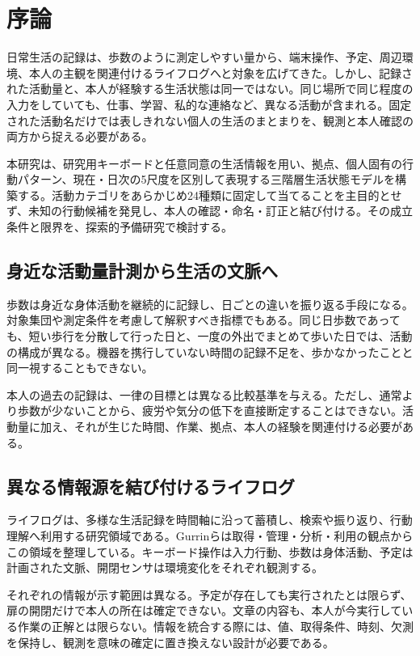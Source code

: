 \chapter{序論}
\label{chap:introduction}

日常生活の記録は、歩数のように測定しやすい量から、端末操作、予定、周辺環境、本人の主観を関連付けるライフログへと対象を広げてきた。しかし、記録された活動量と、本人が経験する生活状態は同一ではない。同じ場所で同じ程度の入力をしていても、仕事、学習、私的な連絡など、異なる活動が含まれる。固定された活動名だけでは表しきれない個人の生活のまとまりを、観測と本人確認の両方から捉える必要がある。

本研究は、研究用キーボードと任意同意の生活情報を用い、拠点、個人固有の行動パターン、現在・日次の5尺度を区別して表現する三階層生活状態モデルを構築する。活動カテゴリをあらかじめ24種類に固定して当てることを主目的とせず、未知の行動候補を発見し、本人の確認・命名・訂正と結び付ける。その成立条件と限界を、探索的予備研究で検討する。

\section{身近な活動量計測から生活の文脈へ}

歩数は身近な身体活動を継続的に記録し、日ごとの違いを振り返る手段になる。対象集団や測定条件を考慮して解釈すべき指標でもある\autocite{tudorlocke2011steps}。同じ日歩数であっても、短い歩行を分散して行った日と、一度の外出でまとめて歩いた日では、活動の構成が異なる。機器を携行していない時間の記録不足を、歩かなかったことと同一視することもできない。

本人の過去の記録は、一律の目標とは異なる比較基準を与える。ただし、通常より歩数が少ないことから、疲労や気分の低下を直接断定することはできない。活動量に加え、それが生じた時間、作業、拠点、本人の経験を関連付ける必要がある。

\section{異なる情報源を結び付けるライフログ}

ライフログは、多様な生活記録を時間軸に沿って蓄積し、検索や振り返り、行動理解へ利用する研究領域である。Gurrinらは取得・管理・分析・利用の観点からこの領域を整理している\autocite{gurrin2014lifelogging}。キーボード操作は入力行動、歩数は身体活動、予定は計画された文脈、開閉センサは環境変化をそれぞれ観測する。

それぞれの情報が示す範囲は異なる。予定が存在しても実行されたとは限らず、扉の開閉だけで本人の所在は確定できない。文章の内容も、本人が今実行している作業の正解とは限らない。情報を統合する際には、値、取得条件、時刻、欠測を保持し、観測を意味の確定に置き換えない設計が必要である。

